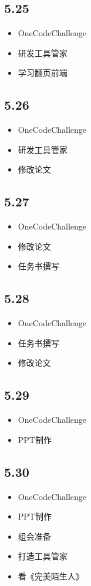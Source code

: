 \documentclass[UTF8]{ctexart}
\begin{document}
\subsection*{5.25}
\begin{itemize}
    \item OneCodeChallenge
    \item 研发工具管家
    \item 学习翻页前端
\end{itemize}

\subsection*{5.26}
\begin{itemize}
    \item OneCodeChallenge
    \item 研发工具管家
    \item 修改论文
\end{itemize}

\subsection*{5.27}
\begin{itemize}
    \item OneCodeChallenge
    \item 修改论文
    \item 任务书撰写
\end{itemize}

\subsection*{5.28}
\begin{itemize}
    \item OneCodeChallenge
    \item 任务书撰写
    \item 修改论文
\end{itemize}

\subsection*{5.29}
\begin{itemize}
    \item OneCodeChallenge
    \item PPT制作
\end{itemize}

\subsection*{5.30}
\begin{itemize}
    \item OneCodeChallenge
    \item PPT制作
    \item 组会准备
    \item 打造工具管家
    \item 看《完美陌生人》
\end{itemize}
\end{document}
